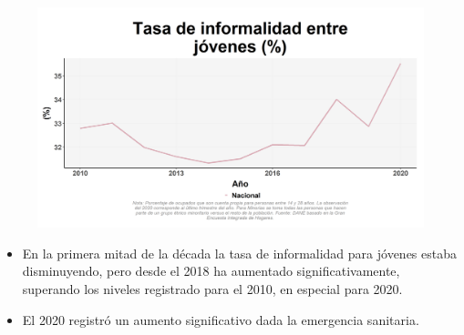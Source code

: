     \begin{figure}[H]
        \caption[Tasa de informalidad entre jóvenes a nivel nacional ]{\label{informaljov_nal_trend} }
        \begin{center}
        \includegraphics[width=\textwidth,keepaspectratio]{img/var_76_trend.png}
        \end{center}
    \end{figure}
            \begin{itemize}
                \item En la primera mitad de la década la tasa de informalidad para jóvenes estaba disminuyendo, pero desde el 2018 ha aumentado significativamente, superando los niveles registrado para el 2010, en especial para 2020.
                \item El 2020 registró un aumento significativo dada la emergencia sanitaria.
                \end{itemize}

